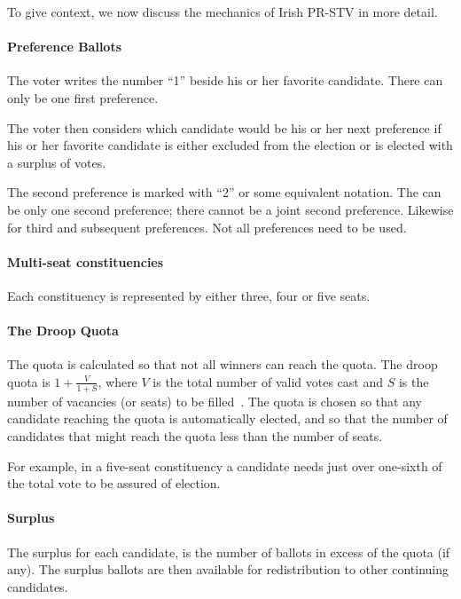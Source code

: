\documentclass[runningheads,a4paper]{llncs}
\begin{document}
To give context, we now discuss the mechanics of Irish PR-STV in more
detail.

\paragraph{Preference Ballots}

The voter writes the number ``1'' beside his or her favorite
candidate.  There can only be one first preference.

The voter then considers which candidate would be his or her next
preference if his or her favorite candidate is either excluded from
the election or is elected with a surplus of votes.

The second preference is marked with ``2'' or some equivalent
notation.  The can be only one second preference; there cannot be a
joint second preference.  Likewise for third and subsequent
preferences.  Not all preferences need to be used.

\paragraph{Multi-seat constituencies}

Each constituency is represented by either three, four or five seats.

\paragraph{The Droop Quota}

The quota is calculated so that not all winners can reach the quota.
The droop quota is $1 + \frac{V}{1+S}$, where $V$ is the total number
of valid votes cast and $S$ is the number of vacancies (or seats) to
be filled~\cite{gallagher1992comparing}.  The quota is chosen so that
any candidate reaching the quota is automatically elected, and so that
the number of candidates that might reach the quota less than the
number of seats.

For example, in a five-seat constituency a candidate needs just over
one-sixth of the total vote to be assured of election.

\paragraph{Surplus}

The surplus for each candidate, is the number of ballots in excess of
the quota (if any).  The surplus ballots are then available for
redistribution to other continuing candidates.
\end{document}

